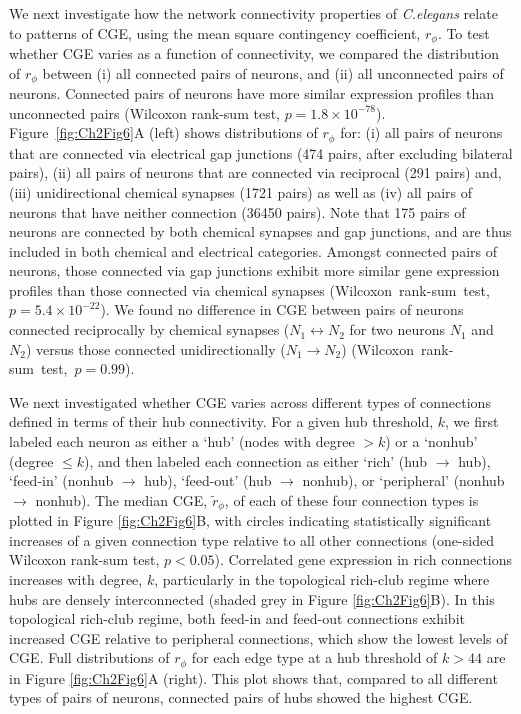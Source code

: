 We next investigate how the network connectivity properties of \emph{C.elegans} relate to patterns of CGE, using the mean square contingency coefficient, $r_\phi$.
To test whether CGE varies as a function of connectivity, we compared the distribution of $r_\phi$ between
(i) all connected pairs of neurons, and
(ii) all unconnected pairs of neurons.
Connected pairs of neurons have more similar expression profiles than unconnected pairs (Wilcoxon rank-sum test, $p = 1.8 \times 10^{-78}$).
Figure~\ref{fig:Ch2Fig6}A (left) shows distributions of $r_\phi$ for:
(i) all pairs of neurons that are connected via electrical gap junctions (474 pairs, after excluding bilateral pairs),
(ii) all pairs of neurons that are connected via reciprocal (291 pairs) and,
(iii) unidirectional chemical synapses (1721 pairs) as well as
(iv) all pairs of neurons that have neither connection (\num{36450} pairs).
Note that 175 pairs of neurons are connected by both chemical synapses and gap junctions, and are thus included in both chemical and electrical categories.
Amongst connected pairs of neurons, those connected via gap junctions exhibit more similar gene expression profiles than those connected via chemical synapses (\mbox{Wilcoxon rank-sum test, $p = 5.4 \times 10^{-22}$}).
We found no difference in CGE between pairs of neurons connected reciprocally by chemical synapses ($N_1 \leftrightarrow N_2$ for two neurons $N_1$ and $N_2$) versus those connected unidirectionally ($N_1 \rightarrow N_2$) \mbox{(Wilcoxon rank-sum test, $p = 0.99$)}.

We next investigated whether CGE varies across different types of connections defined in terms of their hub connectivity.
For a given hub threshold, $k$, we first labeled each neuron as either a `hub' (nodes with degree $> k$) or a `nonhub' (degree $\leq k$), and then labeled each connection as either `rich' (hub $\rightarrow$ hub), `feed-in' (nonhub $\rightarrow$ hub), `feed-out' (hub $\rightarrow$ nonhub), or `peripheral' (nonhub $\rightarrow$ nonhub).
The median CGE, $\tilde{r}_\phi$, of each of these four connection types is plotted in Figure \ref{fig:Ch2Fig6}B, with circles indicating statistically significant increases of a given connection type relative to all other connections (one-sided Wilcoxon rank-sum test, $p < 0.05$).
Correlated gene expression in rich connections increases with degree, $k$, particularly in the topological rich-club regime where hubs are densely interconnected (shaded grey in Figure \ref{fig:Ch2Fig6}B).
In this topological rich-club regime, both feed-in and feed-out connections exhibit increased CGE relative to peripheral connections, which show the lowest levels of CGE.
Full distributions of $r_\phi$ for each edge type at a hub threshold of $k > 44$ are in Figure \ref{fig:Ch2Fig6}A (right).
This plot shows that, compared to all different types of pairs of neurons, connected pairs of hubs showed the highest CGE.

